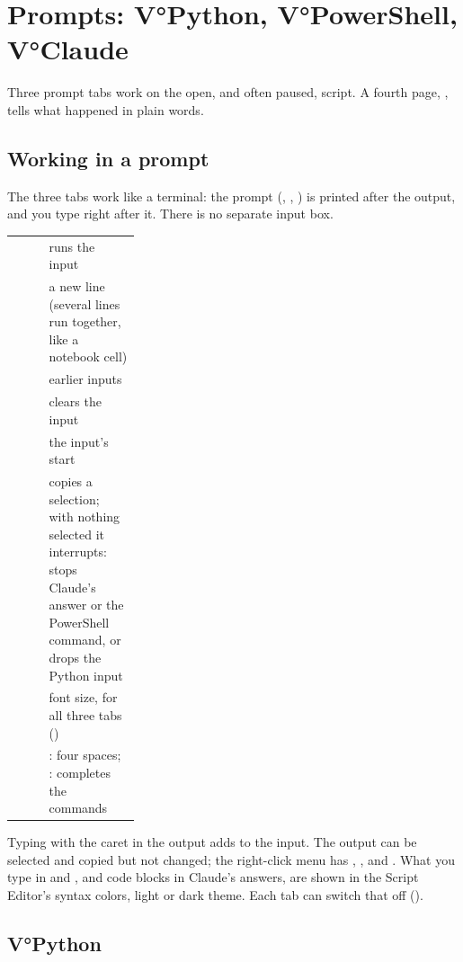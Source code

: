 \chapter{Prompts: V°Python, V°PowerShell, V°Claude}\label{ch:prompts}

Three prompt tabs work on the open, and often paused, script. A fourth page, , tells what happened
in plain words.

\section{Working in a prompt}\label{sec:console}

The three tabs work like a terminal: the prompt (\code{>>> }, , \code{> }) is printed
after the output, and you type right after it. There is no separate input box.

\begin{xltabular}{\linewidth}{@{}P{0.28\linewidth}L@{}}
\toprule
{}             & runs the input \\
      & a new line (several lines run together, like a notebook cell) \\
          & earlier inputs \\
               & clears the input \\
              & the input's start \\
           & copies a selection; with nothing selected it interrupts: stops Claude's answer or the PowerShell command, or drops the Python input \\
 & font size, for all three tabs () \\
               & : four spaces; : completes the \code{/} commands \\
\bottomrule
\end{xltabular}

Typing with the caret in the output adds to the input. The output can be selected and copied but not
changed; the right-click menu has , ,  and . What you type in 
and , and code blocks in Claude's answers, are shown in the Script Editor's syntax colors, light or
dark theme. Each tab can switch that off ().

\section{V°Python}\label{sec:vpython}

